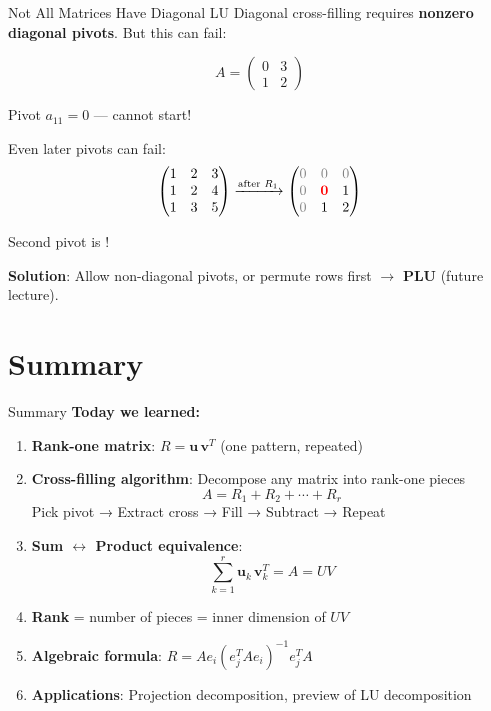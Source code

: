 \documentclass[10pt]{beamer}
\theoremstyle{definition}
\newcommand{\pvt}[1]{{\color{red}\mathbf{#1}}}       %
\newcommand{\rem}[1]{{\color{gray}#1}}                %
\newcommand{\x}[1]{\alert{\textbf{#1}}}
\begin{document}
\begin{frame}{Not All Matrices Have Diagonal LU}
Diagonal cross-filling requires \x{nonzero diagonal pivots}. But this can fail:

$$A = \begin{pmatrix} 0 & 3 \\ 1 & 2 \end{pmatrix}$$

Pivot $a_{11} = 0$ — cannot start!

\vspace{0.3cm}
Even later pivots can fail:
$$\begin{pmatrix} 1 & 2 & 3 \\ 1 & 2 & 4 \\ 1 & 3 & 5 \end{pmatrix}
\xrightarrow{\text{after } R_1} \begin{pmatrix}
\rem{0} & \rem{0} & \rem{0} \\
\rem{0} & \pvt{0} & 1 \\
\rem{0} & 1 & 2
\end{pmatrix}$$

Second pivot is \pvt{zero}!

\vspace{0.2cm}
\textbf{Solution}: Allow non-diagonal pivots, or permute rows first $\to$ \x{PLU} (future lecture).
\end{frame}

\section{Summary}

\begin{frame}{Summary}
\textbf{Today we learned:}

\begin{enumerate}
\item \textbf{Rank-one matrix}: $R = \mathbf{u}\,\mathbf{v}^T$ (one pattern, repeated)

\item \textbf{Cross-filling algorithm}: Decompose any matrix into rank-one pieces
$$A = R_1 + R_2 + \cdots + R_r$$
Pick pivot → Extract cross → Fill → Subtract → Repeat

\item \textbf{Sum $\leftrightarrow$ Product equivalence}:
$$\sum_{k=1}^r \mathbf{u}_k\,\mathbf{v}_k^T = A = UV$$

\item \textbf{Rank} = number of pieces = inner dimension of $UV$

\item \textbf{Algebraic formula}: $R = Ae_i(e_j^TAe_i)^{-1}e_j^TA$

\item \textbf{Applications}: Projection decomposition, preview of LU decomposition
\end{enumerate}
\end{frame}
\end{document}
